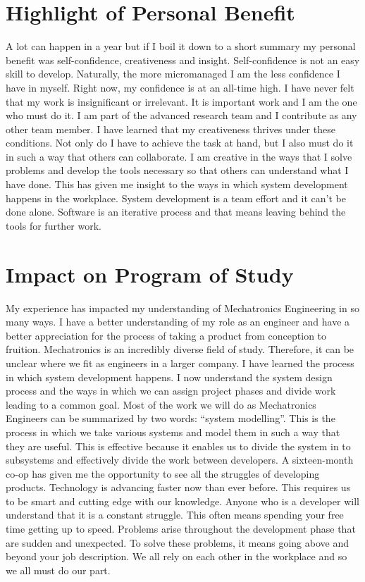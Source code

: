 \documentclass[14pt, a4paper]{awesome-cv}
\begin{document}
\begin{cvletter}
\section*{Highlight of Personal Benefit}
A lot can happen in a year but if I boil it down to a short summary my personal benefit was self-confidence, creativeness and insight.  Self-confidence is not an easy skill to develop.  Naturally, the more micromanaged I am the less confidence I have in myself.  Right now, my confidence is at an all-time high. I have never felt that my work is insignificant or irrelevant.  It is important work and I am the one who must do it.  I am part of the advanced research team and I contribute as any other team member.  I have learned that my creativeness thrives under these conditions.  Not only do I have to achieve the task at hand, but I also must do it in such a way that others can collaborate.  I am creative in the ways that I solve problems and develop the tools necessary so that others can understand what I have done.  This has given me insight to the ways in which system development happens in the workplace.  System development is a team effort and it can’t be done alone.  Software is an iterative process and that means leaving behind the tools for further work.

\section*{Impact on Program of Study}
My experience has impacted my understanding of Mechatronics Engineering in so many ways.  I have a better understanding of my role as an engineer and have a better appreciation for the process of taking a product from conception to fruition.  Mechatronics is an incredibly diverse field of study.  Therefore, it can be unclear where we fit as engineers in a larger company.  I have learned the process in which system development happens.  I now understand the system design process and the ways in which we can assign project phases and divide work leading to a common goal.  Most of the work we will do as Mechatronics Engineers can be summarized by two words: “system modelling”.  This is the process in which we take various systems and model them in such a way that they are useful.  This is effective because it enables us to divide the system in to subsystems and effectively divide the work between developers.  A sixteen-month co-op has given me the opportunity to see all the struggles of developing products.  Technology is advancing faster now than ever before.  This requires us to be smart and cutting edge with our knowledge.  Anyone who is a developer will understand that it is a constant struggle.  This often means spending your free time getting up to speed.  Problems arise throughout the development phase that are sudden and unexpected.  To solve these problems, it means going above and beyond your job description.  We all rely on each other in the workplace and so we all must do our part.


\end{cvletter}
\end{document}
